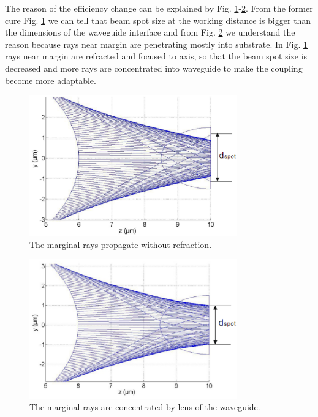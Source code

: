 The reason of the efficiency change can be explained by Fig.  \ref{fig:matlab_coupling_lenses_rxx}-\ref{fig:matlab_coupling_lenses_rxx2}. From the former cure Fig. \ref{fig:matlab_coupling_lenses_rxx} we can tell that beam spot size at the working distance is bigger than the dimensions of the waveguide interface and from Fig. \ref{fig:matlab_coupling_lenses_rxx2} we understand the reason because rays near margin are penetrating mostly into substrate. In Fig. \ref{fig:matlab_coupling_lenses_rxx} rays near margin are refracted and focused to axis, so that the beam spot size is decreased and more rays are concentrated into waveguide to make the coupling become more adaptable.\\   
\begin{figure}[!ht]
\centering
\includegraphics[width=0.8\textwidth]{bilder/beam_ray_without_refract}
\caption{The marginal rays propagate without refraction.}
\label{fig:matlab_coupling_lenses_rxx}
\end{figure}
\begin{figure}[!ht]
\centering
\includegraphics[width=0.8\textwidth]{bilder/beam_ray_refract}
\caption{The marginal rays are concentrated by lens of the waveguide.}
\label{fig:matlab_coupling_lenses_rxx2}
\end{figure}
